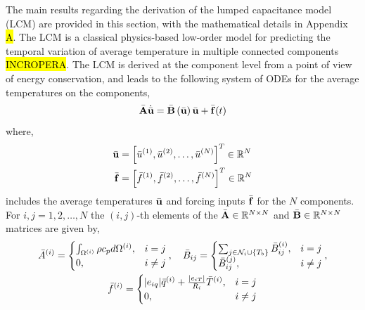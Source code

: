 The main results regarding the derivation of the lumped capacitance model (LCM) are provided in this section, with the mathematical details in Appendix \hl{A}. The LCM is a classical physics-based low-order model for predicting the temporal variation of average temperature in multiple connected components \hl{INCROPERA}. The LCM is derived at the component level from a point of view of energy conservation, and leads to the following system of ODEs for the average temperatures on the components,
\begin{equation}
    \bar{\mathbf{A}}\dot{\bar{\mathbf{u}}} = \bar{\mathbf{B}}\left(\bar{\mathbf{u}}\right)\bar{\mathbf{u}} + \bar{\mathbf{f}}(t)\label{eqn_lcm}
\end{equation}
where,
\begin{subequations}
    \begin{align}
       \bar{\mathbf{u}} &= \left[\bar{u}^{(1)},\bar{u}^{(2)},\dots,\bar{u}^{(N)}\right]^T\in\mathbb{R}^{N}\\
        \bar{\mathbf{f}} &= \left[\bar{f}^{(1)},\bar{f}^{(2)},\dots,\bar{f}^{(N)}\right]^T\in\mathbb{R}^{N}
    \end{align}
\end{subequations}
includes the average temperatures $\bar{\mathbf{u}}$ and forcing inputs $\bar{\mathbf{f}}$ for the $N$ components. For $i,j=1,2,\dots,N$ the $(i,j)$-th elements of the $\bar{\mathbf{A}}\in\mathbb{R}^{N\times N}$ and $\bar{\mathbf{B}}\in\mathbb{R}^{N\times N}$ matrices are given by,
\begin{subequations}
    \begin{gather}
        \bar{A}^{(i)} = \begin{cases}
                \int_{\Omega^{(i)}}\rho c_p d\Omega^{(i)}, & i=j\\
                0, & i\neq j
            \end{cases},\quad \bar{B}_{ij} = \begin{cases}
            \sum_{j\in\mathcal{N}_i\cup\left\{T_b\right\}}\bar{B}^{(i)}_{ij}, &i=j \\
            \bar{B}^{(j)}_{ij}, & i\neq j
        \end{cases},\\ \bar{f}^{(i)} = \begin{cases}
            |e_{iq}|\bar{q}^{(i)} + \frac{|e_{iT}|}{R_{i}}\bar{T}^{(i)}, & i=j \\ 
            0, & i\neq j
        \end{cases}
    \end{gather}
\end{subequations}





